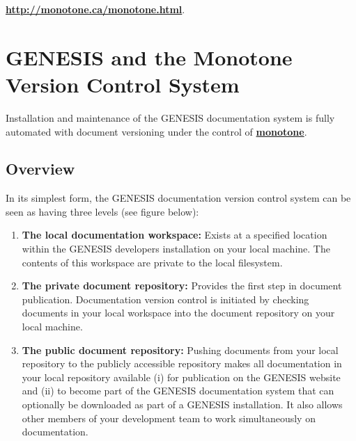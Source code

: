 \documentclass[12pt]{article}
\begin{document}
\href{http://monotone.ca/monotone.html}{\bf http://monotone.ca/monotone.html}.

\section*{GENESIS and the Monotone Version Control System}

Installation and maintenance of the GENESIS documentation system is fully automated with document versioning under the control of \href{http://monotone.ca/}{\bf monotone}. 

\subsection*{Overview}

In its simplest form, the GENESIS documentation version control system can be seen as having three levels (see figure below):
\begin{enumerate}

\item {\bf The local documentation workspace:} Exists at a specified location within the GENESIS developers installation on your local machine. The contents of this workspace are private to the local filesystem.

\item {\bf The private document repository:} Provides the first step in document publication. Documentation version control is initiated by checking documents in your local workspace into the document repository on your local machine.

\item {\bf The public document repository:} Pushing documents from your local repository to the publicly accessible repository makes all documentation in your local repository available (i) for publication on the GENESIS website and (ii) to become part of the GENESIS documentation system that can optionally be downloaded as part of a GENESIS installation. It also allows other members of your development team to work simultaneously on documentation.

\end{enumerate}
\end{document}
